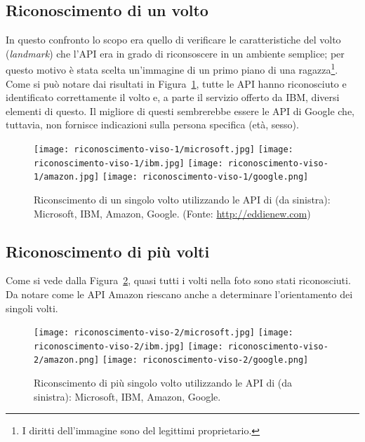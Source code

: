 \subsection{Riconoscimento di un volto}\label{subsec:riconscimento-singolo-volto}
In questo confronto lo scopo era quello di verificare le caratteristiche del volto (\textit{landmark}) che l'API era in grado di riconsoscere in un ambiente semplice;
per questo motivo è stata scelta un'immagine di un primo piano di una ragazza\footnote{I diritti dell'immagine sono del legittimi proprietario.}.
Come si può notare dai risultati in Figura~\ref{fig:riconscimento-singolo-volto}, tutte le API hanno riconosciuto e identificato correttamente il volto e, a parte
il servizio offerto da IBM, diversi elementi di questo.
Il migliore di questi sembrerebbe essere le API di Google che, tuttavia, non fornisce indicazioni sulla persona specifica (età, sesso).
\begin{figure}[!h]
\begin{center}
	\texttt{[image: riconoscimento-viso-1/microsoft.jpg]}
	\texttt{[image: riconoscimento-viso-1/ibm.jpg]}
	\texttt{[image: riconoscimento-viso-1/amazon.jpg]}
	\texttt{[image: riconoscimento-viso-1/google.png]}
{\scriptsize \caption{Riconscimento di un singolo volto utilizzando le API di (da sinistra): Microsoft, IBM, Amazon, Google. (Fonte: \url{http://eddienew.com})}
\label{fig:riconscimento-singolo-volto}}
\end{center}
\end{figure}
%
\subsection{Riconoscimento di più volti}\label{subsec:riconscimento-volti-multipli}
Come si vede dalla Figura~\ref{fig:riconscimento-volti-multipli}, quasi tutti i volti nella foto sono stati riconosciuti.
Da notare come le API Amazon riescano anche a determinare l'orientamento dei singoli volti.
\begin{figure}[!h]
\begin{center}
	\texttt{[image: riconoscimento-viso-2/microsoft.jpg]}
	\texttt{[image: riconoscimento-viso-2/ibm.jpg]}
	\texttt{[image: riconoscimento-viso-2/amazon.png]}
	\texttt{[image: riconoscimento-viso-2/google.png]}
{\scriptsize \caption{Riconscimento di più singolo volto utilizzando le API di (da sinistra): Microsoft, IBM, Amazon, Google.}
\label{fig:riconscimento-volti-multipli}}
\end{center}
\end{figure}
%

